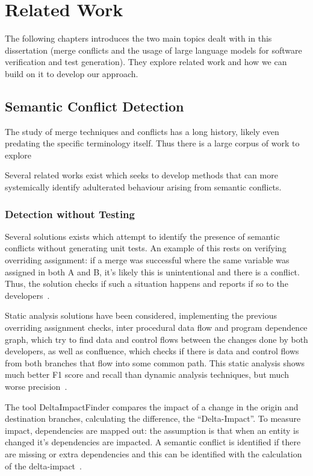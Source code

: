 \chapter{Related Work} \label{chap:sota}

The following chapters introduces the two main topics dealt with in this dissertation (merge conflicts and the usage of large language models for software verification and test generation). They explore related work and how we can build on it to develop our approach.

\section{Semantic Conflict Detection}

The study of merge techniques and conflicts has a long history, likely even predating the specific terminology itself. Thus there is a large corpus of work to explore

Several related works exist which seeks to develop methods that can more systemically identify adulterated behaviour arising from semantic conflicts.

\subsection{Detection without Testing}

Several solutions exists which attempt to identify the presence of semantic conflicts without generating unit tests. An example of this rests on verifying overriding assignment: if a merge was successful where the same variable was assigned in both A and B, it's likely this is unintentional and there is a conflict. Thus, the solution checks if such a situation happens and reports if so to the developers~\citep{kn:assigne}.


Static analysis solutions have been considered, implementing the previous overriding assignment checks, inter procedural data flow and program dependence graph, which try to find data and control flows between the changes done by both developers, as well as confluence, which checks if there is data and control flows from both branches that flow into some common path. This static analysis shows much better F1 score and recall than dynamic analysis techniques, but much worse precision~\citep{kn:staticanal}.


The tool DeltaImpactFinder compares the impact of a change in the origin and destination branches, calculating the difference, the ``Delta-Impact''. To measure impact, dependencies are mapped out: the assumption is that when an entity is changed it's dependencies are impacted. A semantic conflict is identified if there are missing or extra dependencies and this can be identified with the calculation of the delta-impact~\citep{kn:deltaimpact}.

